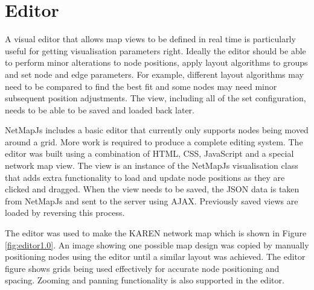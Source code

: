 \documentclass[11pt, a4paper]{report}
\begin{document}
\section{Editor}
\label{sec:editor.impl}

A visual editor that allows map views to be defined in real time is particularly
useful for getting visualisation parameters right. Ideally the editor should be
able to perform minor alterations to node positions, apply layout algorithms to
groups and set node and edge parameters. For example, different layout
algorithms may need to be compared to find the best fit and some nodes may need
minor subsequent position adjustments. The view, including all of the set
configuration, needs to be able to be saved and loaded back later.

NetMapJs includes a basic editor that currently only supports nodes being moved
around a grid. More work is required to produce a complete editing system. The
editor was built using a combination of HTML, CSS, JavaScript and a special
network map view. The view is an instance of the NetMapJs visualisation class
that adds extra functionality to load and update node positions as they are
clicked and dragged. When the view needs to be saved, the JSON data is taken
from NetMapJs and sent to the server using AJAX. Previously saved views are
loaded by reversing this process.

The editor was used to make the KAREN network map which is shown in Figure
\ref{fig:editor1.0}. An image showing one possible map design was copied by
manually positioning nodes using the editor until a similar layout was achieved.
The editor figure shows grids being used effectively for accurate node
positioning and spacing. Zooming and panning functionality is also supported in
the editor.
\end{document}
